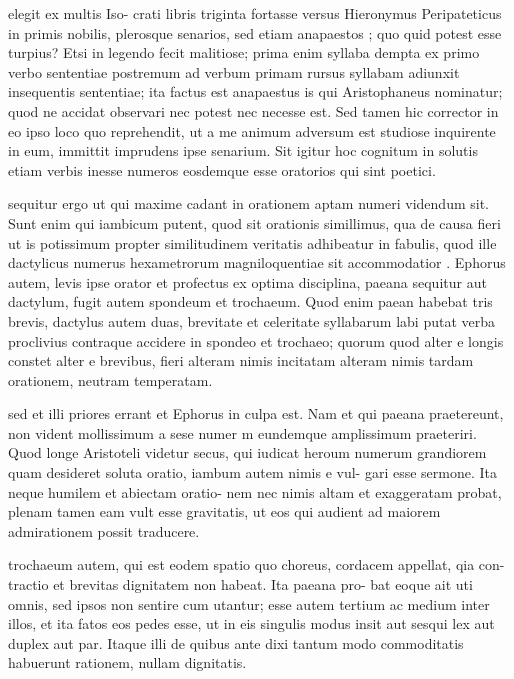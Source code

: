  elegit ex multis Iso- crati libris triginta fortasse versus Hieronymus Peripateticus in primis nobilis, plerosque senarios, sed etiam anapaestos ; quo quid potest esse turpius? Etsi in legendo fecit malitiose; prima enim syllaba dempta ex primo verbo sententiae postremum ad verbum primam rursus syllabam adiunxit insequentis sententiae; ita factus est anapaestus is qui Aristophaneus nominatur; quod ne accidat observari nec potest nec necesse est. Sed tamen hic corrector in eo ipso loco quo reprehendit, ut a me animum adversum est studiose inquirente in eum, immittit imprudens ipse senarium. Sit igitur hoc cognitum in solutis etiam verbis inesse numeros eosdemque esse oratorios qui sint poetici.

 sequitur ergo ut qui maxime cadant in orationem aptam numeri videndum sit. Sunt enim qui iambicum putent, quod sit orationis simillimus, qua de causa fieri ut is potissimum propter similitudinem veritatis adhibeatur in fabulis, quod ille dactylicus numerus hexametrorum magniloquentiae sit accommodatior . Ephorus autem, levis ipse orator et profectus ex optima disciplina, paeana sequitur aut dactylum, fugit autem spondeum et trochaeum. Quod enim paean habebat tris brevis, dactylus autem duas, brevitate et celeritate syllabarum labi putat verba proclivius contraque accidere in spondeo et trochaeo; quorum quod alter e longis constet alter e brevibus, fieri alteram nimis incitatam alteram nimis tardam orationem, neutram temperatam.

 sed et illi priores errant et Ephorus in culpa est. Nam et qui paeana praetereunt, non vident mollissimum a sese numer m eundemque amplissimum praeteriri. Quod longe Aristoteli videtur secus, qui iudicat heroum numerum grandiorem quam desideret soluta oratio, iambum autem nimis e vul- gari esse sermone. Ita neque humilem et abiectam oratio- nem nec nimis altam et exaggeratam probat, plenam tamen eam vult esse gravitatis, ut eos qui audient ad maiorem admirationem possit traducere.

 trochaeum autem, qui est eodem spatio quo choreus, cordacem appellat, qia con- tractio et brevitas dignitatem non habeat. Ita paeana pro- bat eoque ait uti omnis, sed ipsos non sentire cum utantur; esse autem tertium ac medium inter illos, et ita fatos eos pedes esse, ut in eis singulis modus insit aut sesqui lex aut duplex aut par. Itaque illi de quibus ante dixi tantum modo commoditatis habuerunt rationem, nullam dignitatis.

